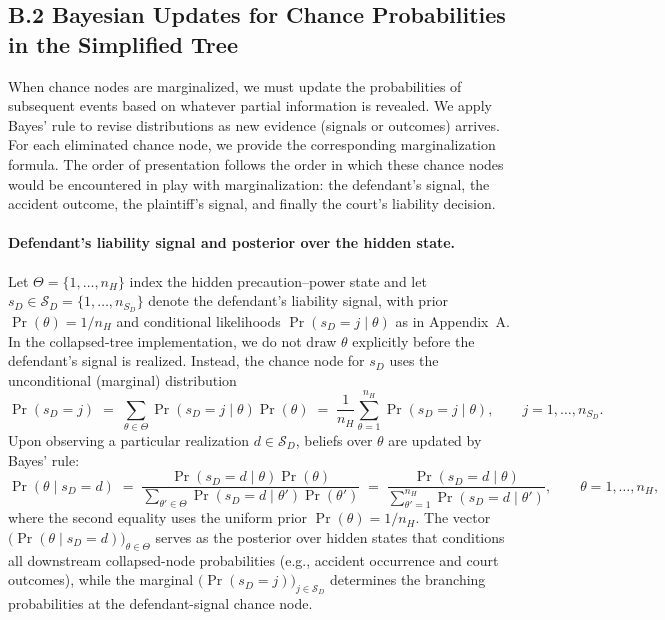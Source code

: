 \documentclass{article}
\begin{document}
\subsection*{B.2 Bayesian Updates for Chance Probabilities in the Simplified Tree}

When chance nodes are marginalized, we must update the probabilities of subsequent events based on whatever partial information is revealed. We apply Bayes’ rule to revise distributions as new evidence (signals or outcomes) arrives. For each eliminated chance node, we provide the corresponding marginalization formula. The order of presentation follows the order in which these chance nodes would be encountered in play with marginalization: the defendant’s signal, the accident outcome, the plaintiff’s signal, and finally the court’s liability decision.

\paragraph{Defendant’s liability signal and posterior over the hidden state.} 
Let $\Theta=\{1,\dots,n_H\}$ index the hidden precaution–power state and let $s_D\in\mathcal{S}_D=\{1,\dots,n_{S_D}\}$ denote the defendant’s liability signal, with prior $\Pr(\theta)=1/n_H$ and conditional likelihoods $\Pr(s_D=j\mid \theta)$ as in Appendix~A. In the collapsed-tree implementation, we do not draw $\theta$ explicitly before the defendant’s signal is realized. Instead, the chance node for $s_D$ uses the unconditional (marginal) distribution \[ \Pr(s_D=j) \;=\; \sum_{\theta\in\Theta}\Pr(s_D=j\mid \theta)\Pr(\theta) \;=\; \frac{1}{n_H}\sum_{\theta=1}^{n_H}\Pr(s_D=j\mid \theta), \qquad j=1,\dots,n_{S_D}. \] Upon observing a particular realization $d\in\mathcal{S}_D$, beliefs over $\theta$ are updated by Bayes’ rule: \[ \Pr(\theta\mid s_D=d) \;=\; \frac{\Pr(s_D=d\mid \theta)\Pr(\theta)}{\sum_{\theta'\in\Theta}\Pr(s_D=d\mid \theta')\Pr(\theta')} \;=\; \frac{\Pr(s_D=d\mid \theta)}{\sum_{\theta'=1}^{n_H}\Pr(s_D=d\mid \theta')}, \qquad \theta=1,\dots,n_H, \] where the second equality uses the uniform prior $\Pr(\theta)=1/n_H$. The vector $\bigl(\Pr(\theta\mid s_D=d)\bigr)_{\theta\in\Theta}$ serves as the posterior over hidden states that conditions all downstream collapsed-node probabilities (e.g., accident occurrence and court outcomes), while the marginal $\bigl(\Pr(s_D=j)\bigr)_{j\in\mathcal{S}_D}$ determines the branching probabilities at the defendant-signal chance node.
\end{document}
